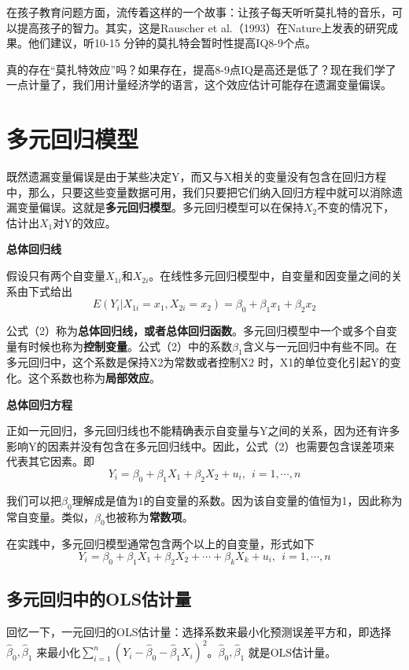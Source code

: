 \documentclass[cn,12pt,math=newtx,citestyle=gb7714-2015,bibstyle=gb7714-2015]{elegantbook}
\begin{document}
	在孩子教育问题方面，流传着这样的一个故事：让孩子每天听听莫扎特的音乐，可以提高孩子的智力。其实，这是Rauscher et al.（1993）在Nature上发表的研究成果。他们建议，听10-15 分钟的莫扎特会暂时性提高IQ8-9个点。
	
	真的存在“莫扎特效应”吗？如果存在，提高8-9点IQ是高还是低了？现在我们学了一点计量了，我们用计量经济学的语言，这个效应估计可能存在遗漏变量偏误。
	
	\section{多元回归模型}
	既然遗漏变量偏误是由于某些决定Y，而又与X相关的变量没有包含在回归方程中，那么，只要这些变量数据可用，我们只要把它们纳入回归方程中就可以消除遗漏变量偏误。这就是\textbf{多元回归模型}。多元回归模型可以在保持$X_2$不变的情况下，估计出$X_1$对Y的效应。
	
	\textbf{总体回归线}
	
	假设只有两个自变量$X_{1i}$和$X_{2i}$。在线性多元回归模型中，自变量和因变量之间的关系由下式给出
	\begin{equation}
		E(Y_i|X_{1i}=x_1,X_{2i}=x_2)=\beta_0+\beta_1x_1+\beta_2x_2
	\end{equation}
	
	公式（2）称为\textbf{总体回归线，或者总体回归函数}。多元回归模型中一个或多个自变量有时候也称为\textbf{控制变量}。公式（2）中的系数$\beta_1$含义与一元回归中有些不同。在多元回归中，这个系数是保持X2为常数或者控制X2 时，X1的单位变化引起Y的变化。这个系数也称为\textbf{局部效应}。
	
	\textbf{总体回归方程}
	
	正如一元回归，多元回归线也不能精确表示自变量与Y之间的关系，因为还有许多影响Y的因素并没有包含在多元回归线中。因此，公式（2）也需要包含误差项来代表其它因素。即
	\begin{equation}
		Y_i=\beta_0+\beta_1X_1+\beta_2X_2+u_i,~~i=1,\cdots,n
	\end{equation}
	
	我们可以把$\beta_0$理解成是值为1的自变量的系数。因为该自变量的值恒为1，因此称为常自变量。类似，$\beta_0$也被称为\textbf{常数项}。
	
	在实践中，多元回归模型通常包含两个以上的自变量，形式如下
	\begin{equation}
		Y_i=\beta_0+\beta_1X_1+\beta_2X_2+\cdots+\beta_kX_k+u_i,~~i=1,\cdots,n
	\end{equation}
	
	\subsection{多元回归中的OLS估计量}
	回忆一下，一元回归的OLS估计量：选择系数来最小化预测误差平方和，即选择$\hat{\beta}_0,\hat{\beta}_1$ 来最小化$\sum_{i=1}^{n}{(Y_i-\hat{\beta}_0-\hat{\beta}_1X_i)^2}$。$\hat{\beta}_0,\hat{\beta}_1$ 就是OLS估计量。
	
\end{document}
